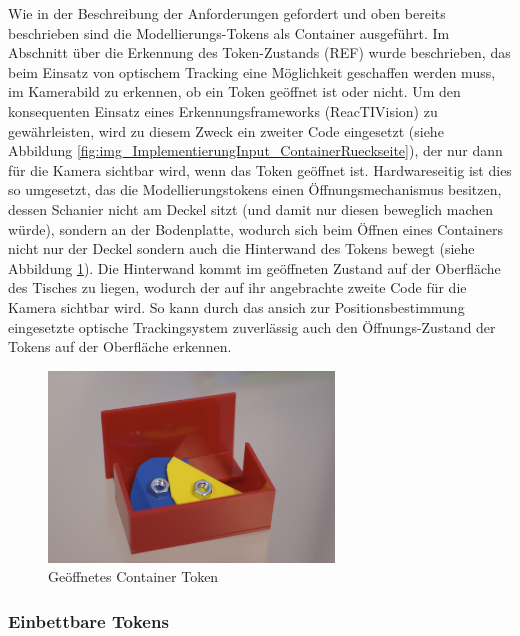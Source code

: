 Wie in der Beschreibung der Anforderungen gefordert und oben bereits beschrieben sind die Modellierungs-Tokens als Container ausgeführt. Im Abschnitt über die Erkennung des Token-Zustands (REF) wurde beschrieben, das beim Einsatz von optischem Tracking eine Möglichkeit geschaffen werden muss, im Kamerabild zu erkennen, ob ein Token geöffnet ist oder nicht. Um den konsequenten Einsatz eines Erkennungsframeworks (ReacTIVision) zu gewährleisten, wird zu diesem Zweck ein zweiter Code eingesetzt (siehe Abbildung \ref{fig:img_ImplementierungInput_ContainerRueckseite}), der nur dann für die Kamera sichtbar wird, wenn das Token geöffnet ist. Hardwareseitig ist dies so umgesetzt, das die Modellierungstokens einen Öffnungsmechanismus besitzen, dessen Schanier nicht am Deckel sitzt (und damit nur diesen beweglich machen würde), sondern an der Bodenplatte, wodurch sich beim Öffnen eines Containers nicht nur der Deckel sondern auch die Hinterwand des Tokens bewegt (siehe Abbildung \ref{fig:img_ImplementierungInput_ContainerToken}). Die Hinterwand kommt im geöffneten Zustand auf der Oberfläche des Tisches zu liegen, wodurch der auf ihr angebrachte zweite Code für die Kamera sichtbar wird. So kann durch das ansich zur Positionsbestimmung eingesetzte optische Trackingsystem zuverlässig auch den Öffnungs-Zustand der Tokens auf der Oberfläche erkennen.

\begin{figure}[htbp]
	\centering
		\includegraphics[height=2in]{img/ImplementierungInput/ContainerToken.jpg}
	\caption{Geöffnetes Container Token}
	\label{fig:img_ImplementierungInput_ContainerToken}
\end{figure}


\subsubsection{Einbettbare Tokens} %
\label{einbettbare_tokens}

